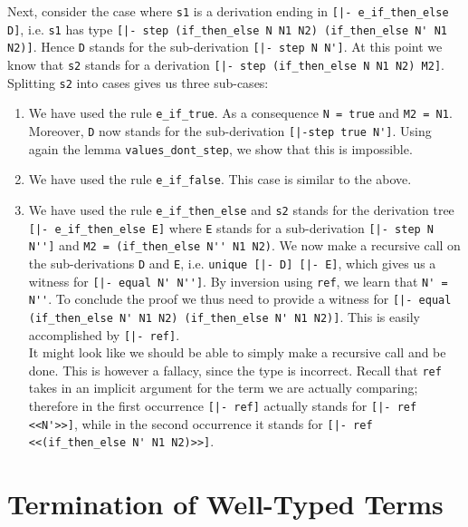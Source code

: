 Next, consider the case where \lstinline!s1! is a derivation ending in
\lstinline![|- e_if_then_else D]!, i.e. \lstinline!s1! has type
\lstinline![|- step (if_then_else N N1 N2) (if_then_else N' N1 N2)]!. Hence \lstinline!D! stands for the sub-derivation
\lstinline![|- step N N']!. At this point we know that \lstinline!s2! stands
for a derivation \lstinline![|- step (if_then_else N N1 N2) M2]!. Splitting
\lstinline!s2! into cases gives us three sub-cases:

\begin{enumerate}
\item We have used the rule \lstinline!e_if_true!. As a consequence
  \lstinline!N = true! and \lstinline!M2 = N1!. Moreover,
  \lstinline!D! now stands for the sub-derivation \lstinline![|-step true N']!.
  Using again the lemma \lstinline!values_dont_step!, we show that this is impossible.

\item We have used the rule \lstinline!e_if_false!. This case is
  similar to the above.

\item We have used the rule \lstinline!e_if_then_else! and
  \lstinline!s2! stands for the derivation tree
\mbox{\lstinline![|- e_if_then_else E]!} where \lstinline!E! stands for a sub-derivation
\lstinline![|- step N N'']! and \lstinline!M2 = (if_then_else N'' N1 N2)!.
We now make a recursive call on the sub-derivations \lstinline!D! and
\lstinline!E!, i.e. \lstinline!unique [|- D] [|- E]!, which gives us a
witness for
\mbox{\lstinline![|- equal N' N'']!}. By inversion using \lstinline!ref!, we learn that
\lstinline!N' = N''!. To conclude the proof we thus need to provide a witness for
\lstinline![|- equal (if_then_else N' N1 N2) (if_then_else N' N1 N2)]!. This is easily
accomplished by \lstinline![|- ref]!. \\[0.5em]
It might look like we should be able to simply make a recursive call
and be done. This is
however a fallacy, since the type is incorrect. Recall that \lstinline!ref!
takes in an implicit argument for the term we are actually comparing; therefore
in the first occurrence \lstinline![|- ref]! actually stands for
\lstinline![|- ref <<N'>>]!, while in the second occurrence it
stands for \lstinline![|- ref <<(if_then_else N' N1 N2)>>]!.
\end{enumerate}



\section{Termination of Well-Typed Terms}\label{sec:termination}

